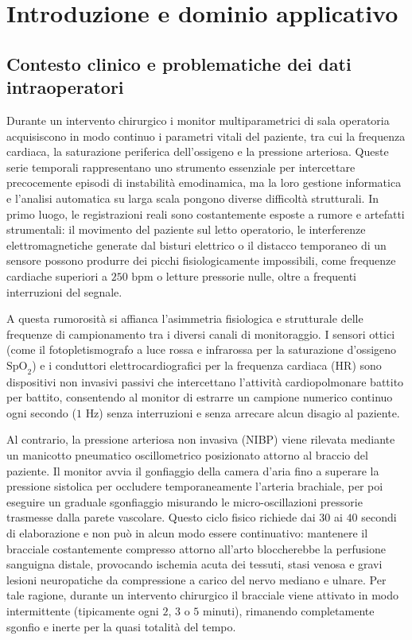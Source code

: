 \chapter{Introduzione e dominio applicativo}

\section{Contesto clinico e problematiche dei dati intraoperatori}
Durante un intervento chirurgico i monitor multiparametrici di sala operatoria acquisiscono in modo continuo i parametri vitali del paziente, tra cui la frequenza cardiaca, la saturazione periferica dell'ossigeno e la pressione arteriosa. Queste serie temporali rappresentano uno strumento essenziale per intercettare precocemente episodi di instabilit\`a emodinamica, ma la loro gestione informatica e l'analisi automatica su larga scala pongono diverse difficolt\`a strutturali. In primo luogo, le registrazioni reali sono costantemente esposte a rumore e artefatti strumentali: il movimento del paziente sul letto operatorio, le interferenze elettromagnetiche generate dal bisturi elettrico o il distacco temporaneo di un sensore possono produrre dei picchi fisiologicamente impossibili, come frequenze cardiache superiori a $250\text{ bpm}$ o letture pressorie nulle, oltre a frequenti interruzioni del segnale.

A questa rumorosit\`a si affianca l'asimmetria fisiologica e strutturale delle frequenze di campionamento tra i diversi canali di monitoraggio. I sensori ottici (come il fotopletismografo a luce rossa e infrarossa per la saturazione d'ossigeno $\text{SpO}_2$) e i conduttori elettrocardiografici per la frequenza cardiaca ($\text{HR}$) sono dispositivi non invasivi passivi che intercettano l'attivit\`a cardiopolmonare battito per battito, consentendo al monitor di estrarre un campione numerico continuo ogni secondo ($1\text{ Hz}$) senza interruzioni e senza arrecare alcun disagio al paziente.

Al contrario, la pressione arteriosa non invasiva (NIBP) viene rilevata mediante un manicotto pneumatico oscillometrico posizionato attorno al braccio del paziente. Il monitor avvia il gonfiaggio della camera d'aria fino a superare la pressione sistolica per occludere temporaneamente l'arteria brachiale, per poi eseguire un graduale sgonfiaggio misurando le micro-oscillazioni pressorie trasmesse dalla parete vascolare. Questo ciclo fisico richiede dai $30$ ai $40$ secondi di elaborazione e non pu\`o in alcun modo essere continuativo: mantenere il bracciale costantemente compresso attorno all'arto bloccherebbe la perfusione sanguigna distale, provocando ischemia acuta dei tessuti, stasi venosa e gravi lesioni neuropatiche da compressione a carico del nervo mediano e ulnare. Per tale ragione, durante un intervento chirurgico il bracciale viene attivato in modo intermittente (tipicamente ogni $2$, $3$ o $5$ minuti), rimanendo completamente sgonfio e inerte per la quasi totalit\`a del tempo.

